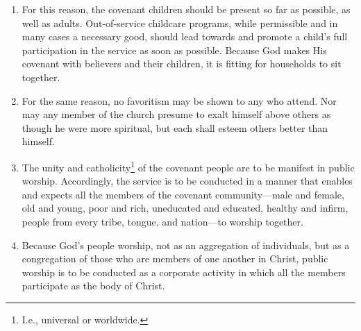 \documentclass[
]{book}
\providecommand{\tightlist}{%
  \setlength{\itemsep}{0pt}\setlength{\parskip}{0pt}}
\begin{document}
\begin{enumerate}
  \begin{enumerate}
  \def\labelenumii{\alph{enumii}.}
  \tightlist
  \item
    For this reason, the covenant children should be present so far as possible, as well as adults. Out-of-service childcare programs, while permissible and in many cases a necessary good, should lead towards and promote a child's full participation in the service as soon as possible. Because God makes His covenant with believers and their children, it is fitting for households to sit together.
  \item
    For the same reason, no favoritism may be shown to any who attend. Nor may any member of the church presume to exalt himself above others as though he were more spiritual, but each shall esteem others better than himself.
  \item
    The unity and catholicity\footnote{I.e., universal or worldwide.} of the covenant people are to be manifest in public worship. Accordingly, the service is to be conducted in a manner that enables and expects all the members of the covenant community---male and female, old and young, poor and rich, uneducated and educated, healthy and infirm, people from every tribe, tongue, and nation---to worship together.
  \item
    Because God's people worship, not as an aggregation of individuals, but as a congregation of those who are members of one another in Christ, public worship is to be conducted as a corporate activity in which all the members participate as the body of Christ.
  \end{enumerate}
\end{enumerate}
\end{document}
